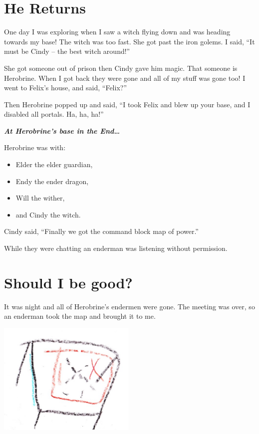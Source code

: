 \documentclass[letterpaper, oneside, 12pt]{krantz}
\providecommand{\tightlist}{%
  \setlength{\itemsep}{0pt}\setlength{\parskip}{0pt}}
\begin{document}
\clearpage

\hypertarget{he-returns}{%
\section{He Returns}\label{he-returns}}

One day I was exploring when I saw a witch flying down and was heading
towards my base! The witch was too fast. She got past the iron golems. I
said, ``It must be Cindy -- the best witch around!''

She got someone out of prison then Cindy gave him magic. That someone is
Herobrine. When I got back they were gone and all of my stuff was gone
too! I went to Felix's house, and said, ``Felix?''

Then Herobrine popped up and said, ``I took Felix and blew up your base,
and I disabled all portals. Ha, ha, ha!''

\textbf{\emph{At Herobrine's base in the End\ldots{}}}

Herobrine was with:

\begin{itemize}
\tightlist
\item
  Elder the elder guardian,
\item
  Endy the ender dragon,
\item
  Will the wither,
\item
  and Cindy the witch.
\end{itemize}

Cindy said, ``Finally we got the command block map of power.''

While they were chatting an enderman was listening without permission.

\hypertarget{should-i-be-good}{%
\section{Should I be good?}\label{should-i-be-good}}

It was night and all of Herobrine's endermen were gone. The meeting was
over, so an enderman took the map and brought it to me.

\includegraphics[width=2.60417in,height=\textheight]{img/final-war/table-and-map.jpg}
\end{document}
